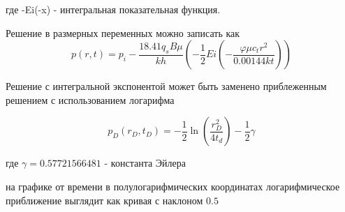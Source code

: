 \documentclass[oneside, openany]{memoir}
\begin{document}
	где -Ei(-x) - интегральная показательная функция.
	
	Решение в размерных переменных можно записать как
	$$
	p\left(r,t\right)=p_i-\frac{18.41q_sB\mu}{kh}\left(-\frac{1}{2} Ei \left(-\frac{\varphi\mu c_tr^2}{0.00144kt}\right)\right) 
	$$
	
	
	Решение с интегральной экспонентой может быть заменено приблеженным решением с использованием логарифма 
	
	$$ 
	p_D(r_D,t_D) = - \frac{1}{2} \ln \left( \dfrac{ r_D^2}{4t_d} \right) - \frac{1}{2}\gamma 
	$$
	
	где $\gamma = 0.57721566481$ - константа Эйлера
	
	на графике от времени в полулогарифмических координатах логарифмическое приближение выглядит как кривая с наклоном $0.5$
	
	\printbibliography
\end{document}
